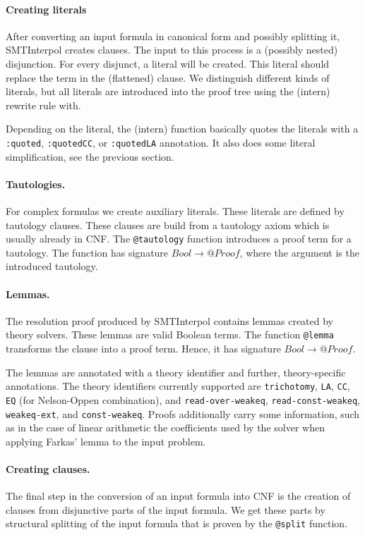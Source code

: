\documentclass[a4paper]{article}
\newcommand\si{SMTInterpol\xspace}
\begin{document}
\paragraph{Creating literals}  After converting an input formula in canonical
form and possibly splitting it, \si creates clauses.  The input to this
process is a (possibly nested) disjunction.  For every disjunct, a literal
will be created.  This literal should replace the term in the (flattened)
clause.  We distinguish different kinds of literals, but all literals are
introduced into the proof tree using the (intern) rewrite rule with.

Depending on the literal, the (intern) function basically quotes the literals
with a \texttt{:quoted}, \texttt{:quotedCC}, or \texttt{:quotedLA} annotation.
It also does some literal simplification, see the previous section.

\paragraph{Tautologies.}  For complex formulas we create auxiliary literals.
These literals are defined by tautology clauses.  These clauses are build from
a tautology axiom which is usually already in CNF.  The \verb+@tautology+
function introduces a proof term for a tautology.  The function has
signature $Bool\rightarrow @Proof$, where the argument is the introduced
tautology.

\paragraph{Lemmas.}  The resolution proof produced by \si contains lemmas
created by theory solvers.  These lemmas are valid Boolean terms.  The
function \verb+@lemma+ transforms the clause into a proof term.  Hence, it has
signature $Bool\rightarrow @Proof$.

The lemmas are annotated with a theory identifier and further,
theory-specific annotations.  The theory identifiers currently supported are
\verb+trichotomy+, \verb+LA+, \verb+CC+, \verb+EQ+ (for Nelson-Oppen combination), and
\verb+read-over-weakeq+, \verb+read-const-weakeq+, \verb+weakeq-ext+,
and \verb+const-weakeq+.  Proofs additionally carry some information, such
as in the case of linear arithmetic the coefficients used by the solver
when applying Farkas' lemma to the input
problem.

\paragraph{Creating clauses.}  The final step in the conversion of an input
formula into CNF is the creation of clauses from disjunctive parts of the
input formula.  We get these parts by structural splitting of the input
formula that is proven by the \verb+@split+ function.
\end{document}
